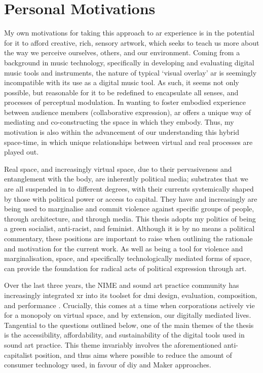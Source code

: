 \section{Personal Motivations}\label{sec: introduction-motivations}
My own motivations for taking this approach to \gls{ar} experience is in the potential for it to afford creative, rich, sensory artwork, which seeks to teach us more about the way we perceive ourselves, others, and our environment. Coming from a background in music technology, specifically in developing and evaluating digital music tools and instruments, the nature of typical `visual overlay' \gls{ar} is seemingly incompatible with its use as a digital music tool. As such, it seems not only possible, but reasonable for it to be redefined to encapsulate all senses, and processes of perceptual modulation. In wanting to foster embodied experience between audience members (collaborative expression), \gls{ar} offers a unique way of mediating and co-constructing the space in which they embody. Thus, my motivation is also within the advancement of our understanding this hybrid space-time, in which unique relationships between virtual and real processes are played out.

Real space, and increasingly virtual space, due to their pervasiveness and entanglement with the body, are inherently political media; substrates that we are all suspended in to different degrees, with their currents systemically shaped by those with political power or access to capital. They have and increasingly are being used to marginalise and commit violence against specific groups of people, through architecture, and through media. This thesis adopts my politics of being a green socialist, anti-racist, and feminist. Although it is by no means a political commentary, these positions are important to raise when outlining the rationale and motivation for the current work. As well as being a tool for violence and marginalisation, space, and specifically technologically mediated forms of space, can provide the foundation for radical acts of political expression through art.

Over the last three years, the NIME and sound art practice community has increasingly integrated \gls{xr} into its toolset for \gls{dmi} design, evaluation, composition, and performance \citep[e.g.][]{chevalier2017,lee2020,camci2021}. Crucially, this comes at a time when corporations actively vie for a monopoly on virtual space, and by extension, our digitally mediated lives. Tangential to the questions outlined below, one of the main themes of the thesis is the accessibility, affordability, and sustainability of the digital tools used in sound art practice. This theme invariably involves the aforementioned anti-capitalist position, and thus aims where possible to reduce the amount of consumer technology used, in favour of \gls{diy} and Maker approaches.



